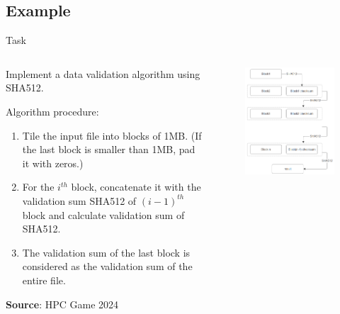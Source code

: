 \subsection{Example}

\begin{frame}{Task}
\begin{columns}
    
\begin{column}{0.5\textwidth}

\scriptsize
    Implement a data validation algorithm using SHA512.
    
    Algorithm procedure:
    \begin{enumerate}
        \item Tile the input file into blocks of 1MB. (If the last block is smaller than 1MB, pad it with zeros.)
        \item For the $i^{th}$ block, concatenate it with the validation sum SHA512 of $(i-1)^{th}$ block and calculate validation sum of SHA512.
        \item The validation sum of the last block is considered as the validation sum of the entire file.
    \end{enumerate}

    \textbf{Source}: HPC Game 2024
\end{column}

\begin{column}{0.5\textwidth}
    \begin{figure}
        \centering
        \includegraphics[width=0.65\linewidth]{day8_am/img/mpi/SHA512.png}
    \end{figure}
\end{column}
\end{columns}
\end{frame}

